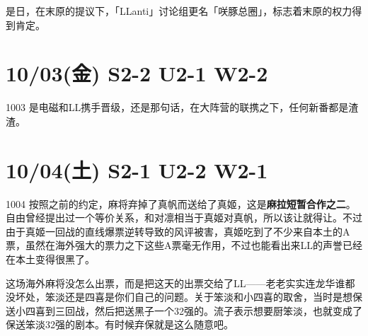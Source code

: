 是日，在末原的提议下，「LLanti」讨论组更名「咲豚总圈」，标志着末原的权力得到肯定。

\section{10/03(金) S2-2 U2-1 W2-2}


1003 是电磁和LL携手晋级，还是那句话，在大阵营的联携之下，任何新番都是渣渣。

\section{10/04(土) S2-1 U2-2 W2-1}


1004 按照之前的约定，麻将弃掉了真帆而送给了真姬，这是\textbf{麻拉短暂合作之二}。自由曾经提出过一个等价关系，和对凛相当于真姬对真帆，所以该让就得让。不过由于真姬一回战的直线爆票逆转导致的风评被害，真姬吃到了不少来自本土的A票，虽然在海外强大的票力之下这些A票毫无作用，不过也能看出来LL的声誉已经在本土变得很黑了。

这场海外麻将没怎么出票，而是把这天的出票交给了LL——老老实实连龙华谁都没坏处，笨淡还是四喜是你们自己的问题。关于笨淡和小四喜的取舍，当时是想保送小四喜到三回战，然后把送黑子一个32强的。流子表示想要厨笨淡，也就变成了保送笨淡32强的剧本。有时候弃保就是这么随意吧。

